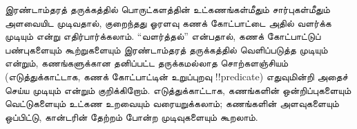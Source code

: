 \documentclass[../../../include/open-logic-section]{subfiles}
\begin{document}



இரண்டாம்தரத் தருக்கத்தில் பொருட்களத்தின் உட்கணங்கள்மீதும்
சார்புகள்மீதும் அளவையிட முடிவதால், குறைந்தது ஓரளவு கணக் கோட்பாட்டை
அதில் வளர்க்க முடியும் என்று எதிர்பார்க்கலாம். “வளர்த்தல்” என்பதால்,
கணக் கோட்பாட்டுப் பண்புகளையும் கூற்றுகளையும் இரண்டாம்தரத் தருக்கத்தில்
வெளிப்படுத்த முடியும் என்றும், கணங்களுக்கான தனிப்பட்ட தருக்கமல்லாத
சொற்களஞ்சியம் (எடுத்துக்காட்டாக, கணக் கோட்பாட்டின் உறுப்புறவு
!!{predicate}) எதுவுமின்றி அதைச் செய்ய முடியும் என்றும் குறிக்கிறோம்.
எடுத்துக்காட்டாக, கணங்களின் ஒன்றிப்புகளையும் வெட்டுகளையும் உட்கண
உறவையும் வரையறுக்கலாம்; கணங்களின் அளவுகளையும் ஒப்பிட்டு, கான்டரின்
தேற்றம் போன்ற முடிவுகளையும் கூறலாம்.
\end{document}
